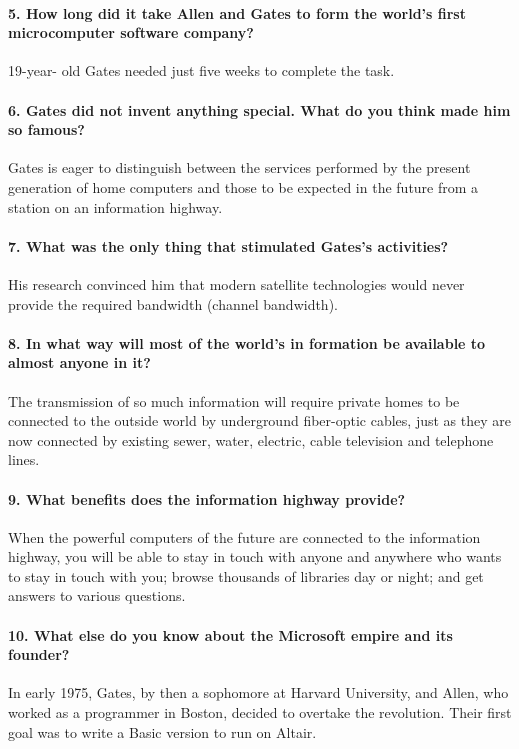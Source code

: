 \documentclass[a5paper, 12pt, twoside]{extreport}
\begin{document}
    \paragraph{5. How long did it take Allen and Gates to form the world's first microcomputer software company?}
    19-year- old Gates needed just five weeks to complete the task.
    
    \paragraph{6. Gates did not invent anything special. What do you think made him so famous?}
    Gates is eager to distinguish between the services performed by the present generation of home computers and those to be expected in the future from a station on an information highway.
    
    \paragraph{7. What was the only thing that stimulated Gates's activities?}
    His research convinced him that modern satellite technologies would never provide the required bandwidth (channel bandwidth).
    
    \paragraph{8. In what way will most of the world's in formation be available to almost anyone in it?}
    The transmission of so much information will require private homes to be connected to the outside world by underground fiber-optic cables, just as they are now connected by existing sewer, water, electric, cable television and telephone lines.
    
    \paragraph{9. What benefits does the information highway provide?}
    When the powerful computers of the future are connected to the information highway, you will be able to stay in touch with anyone and anywhere who wants to stay in touch with you; browse thousands of libraries day or night; and get answers to various questions.
    
    \paragraph{10. What else do you know about the Microsoft empire and its founder?}
    In early 1975, Gates, by then a sophomore at Harvard University, and Allen, who worked as a programmer in Boston, decided to overtake the revolution. Their first goal was to write a Basic version to run on Altair.
    
\end{document}
